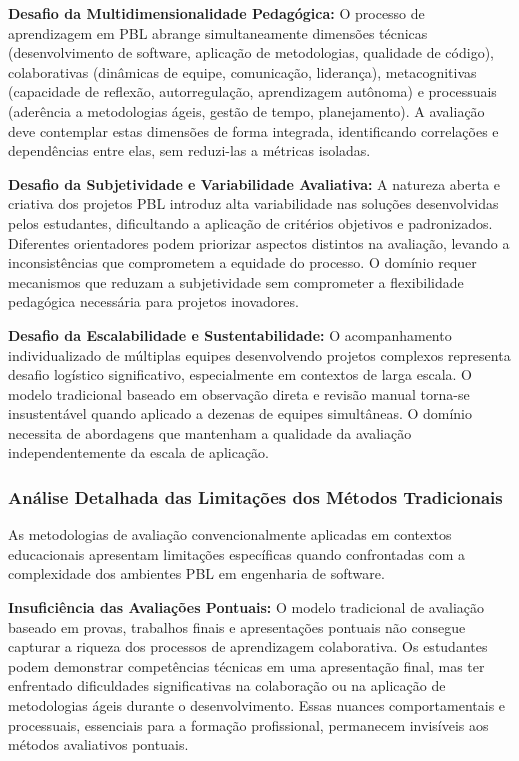 \documentclass[english, spanish, brazilian]{modelo_dt}
\begin{document}
\textbf{Desafio da Multidimensionalidade Pedagógica:} O processo de aprendizagem em PBL abrange simultaneamente dimensões técnicas (desenvolvimento de software, aplicação de metodologias, qualidade de código), colaborativas (dinâmicas de equipe, comunicação, liderança), metacognitivas (capacidade de reflexão, autorregulação, aprendizagem autônoma) e processuais (aderência a metodologias ágeis, gestão de tempo, planejamento). A avaliação deve contemplar estas dimensões de forma integrada, identificando correlações e dependências entre elas, sem reduzi-las a métricas isoladas.

\textbf{Desafio da Subjetividade e Variabilidade Avaliativa:} A natureza aberta e criativa dos projetos PBL introduz alta variabilidade nas soluções desenvolvidas pelos estudantes, dificultando a aplicação de critérios objetivos e padronizados. Diferentes orientadores podem priorizar aspectos distintos na avaliação, levando a inconsistências que comprometem a equidade do processo. O domínio requer mecanismos que reduzam a subjetividade sem comprometer a flexibilidade pedagógica necessária para projetos inovadores.

\textbf{Desafio da Escalabilidade e Sustentabilidade:} O acompanhamento individualizado de múltiplas equipes desenvolvendo projetos complexos representa desafio logístico significativo, especialmente em contextos de larga escala. O modelo tradicional baseado em observação direta e revisão manual torna-se insustentável quando aplicado a dezenas de equipes simultâneas. O domínio necessita de abordagens que mantenham a qualidade da avaliação independentemente da escala de aplicação.

\subsubsection{Análise Detalhada das Limitações dos Métodos Tradicionais}

As metodologias de avaliação convencionalmente aplicadas em contextos
educacionais apresentam limitações específicas quando confrontadas com a
complexidade dos ambientes PBL em engenharia de software.

\textbf{Insuficiência das Avaliações Pontuais:} O modelo tradicional de avaliação baseado em provas, trabalhos finais e apresentações pontuais não consegue capturar a riqueza dos processos de aprendizagem colaborativa. Os estudantes podem demonstrar competências técnicas em uma apresentação final, mas ter enfrentado dificuldades significativas na colaboração ou na aplicação de metodologias ágeis durante o desenvolvimento. Essas nuances comportamentais e processuais, essenciais para a formação profissional, permanecem invisíveis aos métodos avaliativos pontuais.
\end{document}
